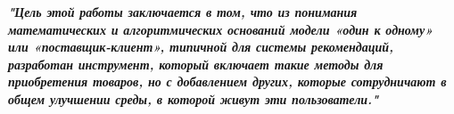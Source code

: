 \textbf{\textit{"Цель этой работы заключается в том, что из понимания математических и алгоритмических оснований модели «один к одному» или «поставщик-клиент», типичной для системы рекомендаций, разработан инструмент, который включает такие методы для приобретения товаров, но с добавлением других, которые сотрудничают в общем улучшении среды, в которой живут эти пользователи."}}











